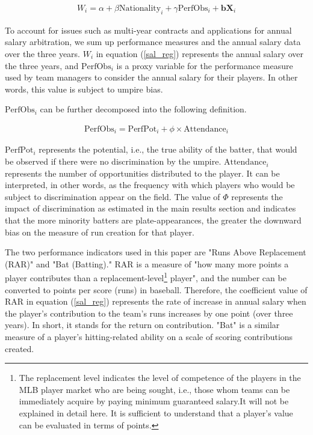\documentclass[dvipdfmx, 12pt]{jsarticle}
\begin{document}
\begin{align}
  W_{i} = \alpha + \beta \text{Nationality}_i + \gamma \text{PerfObs}_{i} + \mathbf{b} \mathbf{X}_{i} \label{sal_reg}
\end{align}

To account for issues such as multi-year contracts and applications for annual salary arbitration, we sum up performance measures and the annual salary data over the three years. $W_{i}$ in equation (\ref{sal_reg}) represents the annual salary over the three years, and $\text{PerfObs}_{i}$ is a proxy variable for the performance measure used by team managers to consider the annual salary for their players. In other words, this value is subject to umpire bias.

$\text{PerfObs}_{i}$ can be further decomposed into the following definition.

\begin{align}
  \text{PerfObs}_{i} = \text{PerfPot}_{i} + \phi \times \text{Attendance}_{i} \label{potential}
\end{align}

$\text{PerfPot}_{i}$ represents the potential, i.e., the true ability of the batter, that would be observed if there were no discrimination by the umpire. $\text{Attendance}_{i}$ represents the number of opportunities distributed to the player. It can be interpreted, in other words, as the frequency with which players who would be subject to discrimination appear on the field. The value of $\Phi$ represents the impact of discrimination as estimated in the main results section and indicates that the more minority batters are plate-appearances, the greater the downward bias on the measure of run creation for that player.

The two performance indicators used in this paper are "Runs Above Replacement (RAR)" and "Bat (Batting)." RAR is a measure of "how many more points a player contributes than a replacement-level\footnote{The replacement level indicates the level of competence of the players in the MLB player market who are being sought, i.e., those whom teams can be immediately acquire by paying minimum guaranteed salary.It will not be explained in detail here. It is sufficient to understand that a player's value can be evaluated in terms of points.} player", and the number can be converted to points per score (runs) in baseball. Therefore, the coefficient value of RAR in equation (\ref{sal_reg}) represents the rate of increase in annual salary when the player's contribution to the team's runs increases by one point (over three years). In short, it stands for the return on contribution. "Bat" is a similar measure of a player's hitting-related ability on a scale of scoring contributions created.
\end{document}
